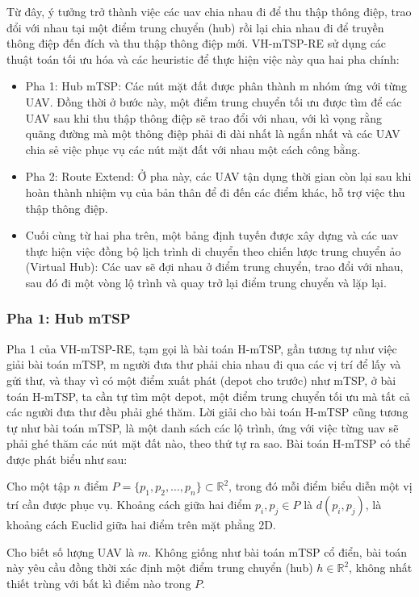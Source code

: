 \documentclass[a4paper]{article}
\begin{document}
Từ đây, ý tưởng trở thành việc các uav chia nhau đi để thu thập thông điệp, trao đổi với nhau tại một điểm trung chuyển (hub) rồi lại chia nhau đi để truyền thông điệp đến đích và thu thập thông điệp mới. VH-mTSP-RE sử dụng các thuật toán tối ưu hóa và các heuristic để thực hiện việc này qua hai pha chính: 
\begin{itemize}
  \item Pha 1: Hub mTSP: Các nút mặt đất được phân thành m nhóm ứng với từng UAV. Đồng thời ở bước này, một điểm trung chuyển tối ưu được tìm để các UAV sau khi thu thập thông điệp sẽ trao đổi với nhau, với kì vọng rằng quãng đường mà một thông điệp phải đi dài nhất là ngắn nhất và các UAV chia sẻ việc phục vụ các nút mặt đất với nhau một cách công bằng.
  \item Pha 2: Route Extend: Ở pha này, các UAV tận dụng thời gian còn lại sau khi hoàn thành nhiệm vụ của bản thân để đi đến các điểm khác, hỗ trợ việc thu thập thông điệp.
  \item Cuối cùng từ hai pha trên, một bảng định tuyến được xây dựng và các uav thực hiện việc đồng bộ lịch trình di chuyển theo chiến lược trung chuyển ảo (Virtual Hub): Các uav sẽ đợi nhau ở điểm trung chuyển, trao đổi với nhau, sau đó đi một vòng lộ trình và quay trở lại điểm trung chuyển và lặp lại.
\end{itemize}

\subsubsection{Pha 1: Hub mTSP} 
Pha 1 của VH-mTSP-RE, tạm gọi là bài toán H-mTSP, gần tương tự như việc giải bài toán mTSP, m người đưa thư phải chia nhau đi qua các vị trí để lấy và gửi thư, và thay vì có một điểm xuất phát (depot cho trước) như mTSP, ở bài toán H-mTSP, ta cần tự tìm một depot, một điểm trung chuyển tối ưu mà tất cả các người đưa thư đều phải ghé thăm. Lời giải cho bài toán H-mTSP cũng tương tự như bài toán mTSP, là một danh sách các lộ trình, ứng với việc từng uav sẽ phải ghé thăm các nút mặt đất nào, theo thứ tự ra sao. Bài toán H-mTSP có thể được phát biểu như sau: 

Cho một tập $n$ điểm \( P = \{p_1, p_2, \dots, p_n\} \subset \mathbb{R}^2 \), trong đó mỗi điểm biểu diễn một vị trí cần được phục vụ. Khoảng cách giữa hai điểm \( p_i, p_j \in P \) là $d(p_i, p_j)$, là khoảng cách Euclid giữa hai điểm trên mặt phẳng 2D.

Cho biết số lượng UAV là \( m \). Không giống như bài toán mTSP cổ điển, bài toán này yêu cầu đồng thời xác định một điểm trung chuyển (hub) \( h \in \mathbb{R}^2 \), không nhất thiết trùng với bất kì điểm nào trong \( P \).
\end{document}
